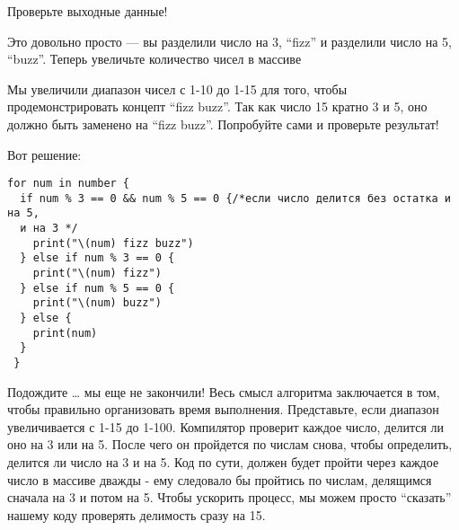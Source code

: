 Проверьте выходные данные!

\vspace{\baselineskip}

Это довольно просто --- вы разделили число на 3, “fizz” и  разделили число на 5, “buzz”. Теперь увеличьте количество чисел в массиве

\vspace{\baselineskip}


\vspace{\baselineskip}

Мы увеличили диапазон чисел с 1-10 до 1-15 для того, чтобы продемонстрировать концепт “fizz buzz”. Так как число 15 кратно 3 и 5, оно должно быть заменено на “fizz buzz”. Попробуйте сами и проверьте результат!

\vspace{\baselineskip}

Вот решение:

\vspace{\baselineskip}

\begin{tcolorbox} 
\begin{verbatim}
for num in number {
  if num % 3 == 0 && num % 5 == 0 {/*если число делится без остатка и на 5,
  и на 3 */
    print("\(num) fizz buzz")
  } else if num % 3 == 0 {
    print("\(num) fizz")
  } else if num % 5 == 0 {
    print("\(num) buzz")
  } else {
    print(num)
  }
 }
\end{verbatim}
\end{tcolorbox}

\vspace{\baselineskip}

Подождите … мы еще не закончили! Весь смысл алгоритма заключается в том, чтобы правильно организовать время выполнения. Представьте, если диапазон увеличивается с 1-15 до 1-100. Компилятор проверит каждое число, делится ли оно на 3 или на 5. После чего он пройдется по числам снова, чтобы определить, делится ли число на 3 и на 5. Код по сути, должен будет пройти через каждое число в массиве дважды - ему следовало бы пройтись по числам, делящимся сначала на 3 и потом на 5. Чтобы ускорить процесс, мы можем просто “сказать” нашему коду проверять делимость сразу на 15.

